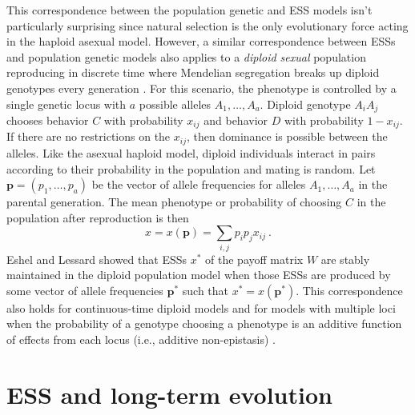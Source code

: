 \documentclass[11pt]{article}
\newcommand{\ess}[1]{#1^*}
\renewcommand{\vec}[1]{\symbf{#1}}
\begin{document}
This correspondence between the population genetic and ESS models isn't particularly surprising since natural selection is the only evolutionary force acting in the haploid asexual model. However, a similar correspondence between ESSs and population genetic models also applies to a \textit{diploid sexual} population reproducing in discrete time where Mendelian segregation breaks up diploid genotypes every generation \cite{Eshel:1982,Lessard:1984}. For this scenario, the phenotype is controlled by a single genetic locus with $a$ possible alleles $A_{1},\ldots,A_{a}$. Diploid genotype $A_{i} A_{j}$ chooses behavior $C$ with probability $x_{ij}$ and behavior $D$ with probability $1-x_{ij}$. If there are no restrictions on the $x_{ij}$, then dominance is possible between the alleles. Like the asexual haploid model, diploid individuals interact in pairs according to their probability in the population and mating is random. Let $\vec{p} = (p_{1}, \ldots, p_{a})$ be the vector of allele frequencies for alleles $A_{1},\ldots,A_{a}$ in the parental generation. The mean phenotype or probability of choosing $C$ in the population after reproduction is then
\begin{equation*}
  x = x(\vec{p}) = \sum_{i,j} p_{i} p_{j} x_{ij} \: .
\end{equation*}
Eshel and Lessard showed \cite{Eshel:1982,Lessard:1984} that ESSs $\ess{x}$ of the payoff matrix $W$ are stably maintained in the diploid population model when those ESSs are produced by some vector of allele frequencies $\ess{\vec{p}}$ such that $\ess{x} = x(\ess{\vec{p}})$. This correspondence also holds for continuous-time diploid models \cite{Sigmund:1987,Cressman:1988,Cressman:Hofbauer:1996,Hofbauer:Sigmund:1998} and for models with multiple loci when the probability of a genotype choosing a phenotype is an additive function of effects from each locus (i.e., additive non-epistasis) \cite{Eshel:1982}.

\section{ESS and long-term evolution}
\label{sec:long-term}
\end{document}

